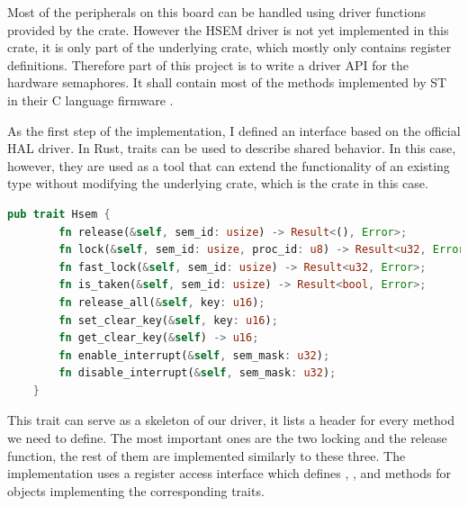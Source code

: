Most of the peripherals on this board can be handled using driver functions provided by the  crate. However the HSEM driver is not yet implemented in this crate, it is only part of the underlying  crate, which mostly only contains register definitions. Therefore part of this project is to write a driver API for the hardware semaphores. It shall contain most of the methods implemented by ST in their C language firmware \cite{HsemCCode}.

As the first step of the implementation, I defined an interface based on the official HAL driver. In Rust, traits can be used to describe shared behavior. In this case, however, they are used as a tool that can extend the functionality of an existing type without modifying the underlying crate, which is the  crate in this case.

\begin{lstlisting}[language=Rust,frame=single,float=!ht,style=customrust,label={lst:hsem-trait-def},caption={HSEM Trait Definition},style=customrust]
    pub trait Hsem {
        fn release(&self, sem_id: usize) -> Result<(), Error>;
        fn lock(&self, sem_id: usize, proc_id: u8) -> Result<u32, Error>;
        fn fast_lock(&self, sem_id: usize) -> Result<u32, Error>;
        fn is_taken(&self, sem_id: usize) -> Result<bool, Error>;
        fn release_all(&self, key: u16);
        fn set_clear_key(&self, key: u16);
        fn get_clear_key(&self) -> u16;
        fn enable_interrupt(&self, sem_mask: u32);
        fn disable_interrupt(&self, sem_mask: u32);
    }
\end{lstlisting}

This trait can serve as a skeleton of our driver, it lists a header for every method we need to define. The most important ones are the two locking and the release function, the rest of them are implemented similarly to these three. The implementation uses a register access interface which defines , , and  methods for objects implementing the corresponding traits.

